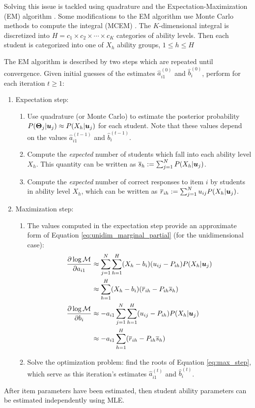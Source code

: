 Solving this issue is tackled using quadrature and the Expectation-Maximization (EM) algorithm  \cite{dempster1977} \cite{bock1981}. Some modifications to the EM algorithm use Monte Carlo methods to compute the integral (MCEM) \cite{meng_schilling1996}. The $K$-dimensional integral is discretized into $H = c_1 \times c_2 \times \cdots \times c_K$ categories of ability levels. Then each student is categorized into one of $X_h$ ability groups, $1\leq h \leq H$

The EM algorithm is described by two steps which are repeated until convergence. Given initial guesses of the estimates $\hat a_{i1}^{(0)}$ and $\hat b_i^{(0)}$, perform for each iteration $t\geq 1$:
\begin{enumerate}
  \item Expectation step:
    \begin{enumerate}
      \item Use quadrature (or Monte Carlo) to estimate the posterior probability $P(\boldsymbol{\Theta}_j | \boldsymbol{u}_j) \approx P(X_h | \boldsymbol{u}_j)$ for each student. Note that these values depend on the values $\hat a_{i1}^{(t-1)}$ and $\hat b_i^{(t-1)}$.
      \item Compute the \textit{expected} number of students which fall into each ability level $X_h$. This quantity can be written as $\overline{s}_h:=\sum_{j=1}^N P(X_h | \boldsymbol{u}_j)$. 
      \item Compute the \textit{expected} number of correct responses to item $i$ by students in ability level $X_h$, which can be written as $\overline{r}_{ih}:=\sum_{j=1}^N u_{ij} P(X_h | \boldsymbol{u}_j)$.
    \end{enumerate}
  \item Maximization step:
    \begin{enumerate}
      \item The values computed in the expectation step provide an approximate form of Equation \ref{eq:unidim_marginal_partial} (for the unidimensional case):
  \begin{equation}
          \begin{split}
            \frac{\partial \log \mathcal{M}}{\partial a_{i1}} &\approx \sum_{j=1}^N \sum_{h=1}^H (X_h - b_i)(u_{ij} - P_{ih}) P(X_h | \boldsymbol{u}_j) \\
          &\approx \sum_{h=1}^H (X_h - b_i)(\overline{r}_{ih} - P_{ih}\overline{s}_h) \\
          \frac{\partial \log \mathcal{M}}{\partial b_i} &\approx -a_{i1} \sum_{j=1}^N \sum_{h=1}^H (u_{ij} - P_{ih}) P(X_h| \boldsymbol{u}_j) \\
          &\approx -a_{i1} \sum_{h=1}^H (\overline{r}_{ih} -P_{ih}\overline{s}_h)
\end{split}
          \label{eq:max_step}
        \end{equation}
      \item Solve the optimization problem: find the roots of Equation \ref{eq:max_step}, which serve as this iteration's estimates $\hat a_{i1}^{(t)}$ and $\hat b_i^{(t)}$.
    \end{enumerate}
\end{enumerate}
After item parameters have been estimated, then student ability parameters can be estimated independently using MLE.


